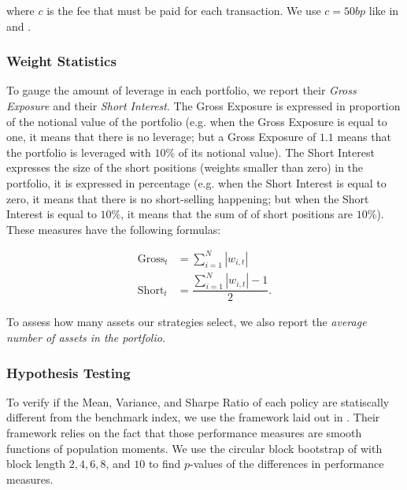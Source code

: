 \documentclass[12pt,oneside,a4paper]{memoir}
\begin{document}
\noindent
where $c$ is the fee that must be paid for each transaction.
We use $c=50bp$ like in  and .

\subsubsection*{Weight Statistics}

To gauge the amount of leverage in each portfolio, we report their \textit{Gross Exposure} and their \textit{Short Interest}.
The Gross Exposure is expressed in proportion of the notional value of the portfolio (e.g. when the Gross Exposure is equal to one, it means that there is no leverage; but a Gross Exposure of $1.1$ means that the portfolio is leveraged with $10\%$ of its notional value).
The Short Interest expresses the size of the short positions (weights smaller than zero) in the portfolio, it is expressed in percentage (e.g. when the Short Interest is equal to zero, it means that there is no short-selling happening; but when the Short Interest is equal to $10\%$, it means that the sum of of short positions are $10\%$).
These measures have the following formulas:

\vspace{-18 pt}
\begin{align*}
\label{gross}
\text{Gross}_{t} &= \sum_{i=1}^{N} |w_{i,t}|
\\
\label{short}
\text{Short}_{t} &= \dfrac{\sum_{i=1}^{N} |w_{i,t}| - 1}{2}.
\end{align*}

To assess how many assets our strategies select, we also report the \textit{average number of assets in the portfolio}.

\subsubsection*{Hypothesis Testing}

To verify if the Mean, Variance, and Sharpe Ratio of each policy are statiscally different from the benchmark index, we use the framework laid out in .
Their framework relies on the fact that those performance measures are smooth functions of population moments.
We use the circular block bootstrap of  with block length $2, 4, 6, 8$, and $10$ to find $p$-values of the differences in performance measures.
\end{document}
